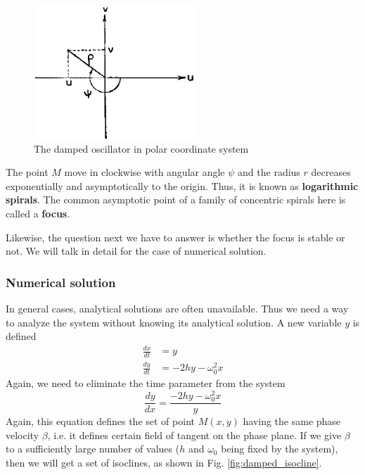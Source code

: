 \begin{figure}[hbt]
  \centerline{\includegraphics[height=5cm]{./images/polar_damped_sys.eps}}
  \caption{The damped oscillator in polar coordinate system}
  \label{fig:polar_damped}
\end{figure}
The point $M$ move in clockwise with angular angle $\psi$ and the
radius $r$ decreases exponentially and asymptotically to the
origin. Thus, it is known as {\bf logarithmic spirals}. The common
asymptotic point of a family of concentric spirals here is called a
{\bf focus}.

Likewise, the question next we have to answer is whether the focus is
stable or not. We will talk in detail for the case of numerical
solution. 


\subsubsection{Numerical solution}
\label{sec:numerical-solution-1}

In general cases, analytical solutions are often unavailable. Thus we
need a way to analyze the system without knowing its analytical
solution. A new variable $y$ is defined
\begin{equation}
  \label{eq:380}
  \begin{split}
    \frac{dx}{dt} &= y \\
    \frac{dy}{dt} &= -2hy - \omega_0^2x
  \end{split}
\end{equation}
Again, we need to eliminate the time parameter from the system
\begin{equation}
  \label{eq:381}
  \frac{dy}{dx} = \frac{-2hy - \omega_0^2x}{y}
\end{equation}
Again, this equation defines the set of point $M(x,y)$ having the same
phase velocity $\beta$, i.e. it defines certain field of tangent on the phase
plane. If we give $\beta$ to a sufficiently large number of values
($h$ and $\omega_0$ being fixed by the system), then we will get a set
of isoclines, as shown in Fig. \ref{fig:damped_isocline}.

